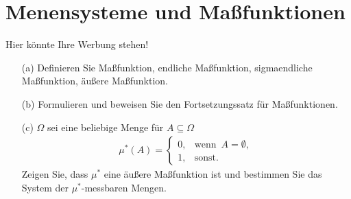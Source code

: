 \section{Menensysteme und Maßfunktionen}

\begin{exercise}

Hier könnte Ihre Werbung stehen!

\begin{itemize}
  \item[(a)] Definieren Sie Maßfunktion, endliche Maßfunktion, sigmaendliche Maßfunktion, äußere Maßfunktion.
  \item[(b)] Formulieren und beweisen Sie den Fortsetzungssatz für Maßfunktionen.
  \item[(c)] $\Omega$ sei eine beliebige Menge für $A \subseteq \Omega$
  \begin{align*}
    \mu^\ast(A) =
    \begin{cases}
      0, & \text{wenn} \enspace A = \emptyset, \\
      1, & \text{sonst}.
    \end{cases}
  \end{align*}
  Zeigen Sie, dass $\mu^\ast$ eine äußere Maßfunktion ist und bestimmen Sie das System der $\mu^\ast$-messbaren Mengen.
\end{itemize}

\end{exercise}

